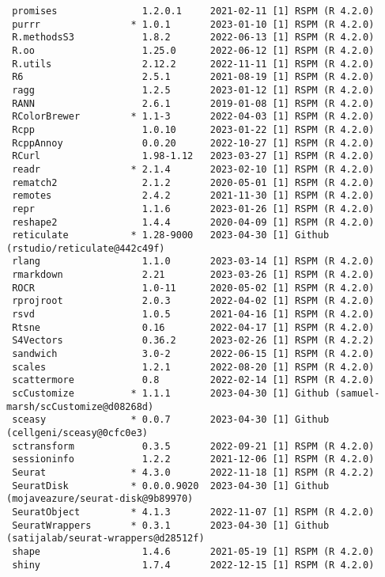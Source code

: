 \documentclass[
  letterpaper,
  DIV=11,
  numbers=noendperiod]{scrartcl}
\begin{document}
\begin{verbatim}
 promises               1.2.0.1     2021-02-11 [1] RSPM (R 4.2.0)
 purrr                * 1.0.1       2023-01-10 [1] RSPM (R 4.2.0)
 R.methodsS3            1.8.2       2022-06-13 [1] RSPM (R 4.2.0)
 R.oo                   1.25.0      2022-06-12 [1] RSPM (R 4.2.0)
 R.utils                2.12.2      2022-11-11 [1] RSPM (R 4.2.0)
 R6                     2.5.1       2021-08-19 [1] RSPM (R 4.2.0)
 ragg                   1.2.5       2023-01-12 [1] RSPM (R 4.2.0)
 RANN                   2.6.1       2019-01-08 [1] RSPM (R 4.2.0)
 RColorBrewer         * 1.1-3       2022-04-03 [1] RSPM (R 4.2.0)
 Rcpp                   1.0.10      2023-01-22 [1] RSPM (R 4.2.0)
 RcppAnnoy              0.0.20      2022-10-27 [1] RSPM (R 4.2.0)
 RCurl                  1.98-1.12   2023-03-27 [1] RSPM (R 4.2.0)
 readr                * 2.1.4       2023-02-10 [1] RSPM (R 4.2.0)
 rematch2               2.1.2       2020-05-01 [1] RSPM (R 4.2.0)
 remotes                2.4.2       2021-11-30 [1] RSPM (R 4.2.0)
 repr                   1.1.6       2023-01-26 [1] RSPM (R 4.2.0)
 reshape2               1.4.4       2020-04-09 [1] RSPM (R 4.2.0)
 reticulate           * 1.28-9000   2023-04-30 [1] Github (rstudio/reticulate@442c49f)
 rlang                  1.1.0       2023-03-14 [1] RSPM (R 4.2.0)
 rmarkdown              2.21        2023-03-26 [1] RSPM (R 4.2.0)
 ROCR                   1.0-11      2020-05-02 [1] RSPM (R 4.2.0)
 rprojroot              2.0.3       2022-04-02 [1] RSPM (R 4.2.0)
 rsvd                   1.0.5       2021-04-16 [1] RSPM (R 4.2.0)
 Rtsne                  0.16        2022-04-17 [1] RSPM (R 4.2.0)
 S4Vectors              0.36.2      2023-02-26 [1] RSPM (R 4.2.2)
 sandwich               3.0-2       2022-06-15 [1] RSPM (R 4.2.0)
 scales                 1.2.1       2022-08-20 [1] RSPM (R 4.2.0)
 scattermore            0.8         2022-02-14 [1] RSPM (R 4.2.0)
 scCustomize          * 1.1.1       2023-04-30 [1] Github (samuel-marsh/scCustomize@d08268d)
 sceasy               * 0.0.7       2023-04-30 [1] Github (cellgeni/sceasy@0cfc0e3)
 sctransform            0.3.5       2022-09-21 [1] RSPM (R 4.2.0)
 sessioninfo            1.2.2       2021-12-06 [1] RSPM (R 4.2.0)
 Seurat               * 4.3.0       2022-11-18 [1] RSPM (R 4.2.2)
 SeuratDisk           * 0.0.0.9020  2023-04-30 [1] Github (mojaveazure/seurat-disk@9b89970)
 SeuratObject         * 4.1.3       2022-11-07 [1] RSPM (R 4.2.0)
 SeuratWrappers       * 0.3.1       2023-04-30 [1] Github (satijalab/seurat-wrappers@d28512f)
 shape                  1.4.6       2021-05-19 [1] RSPM (R 4.2.0)
 shiny                  1.7.4       2022-12-15 [1] RSPM (R 4.2.0)

\end{verbatim}
\end{document}
